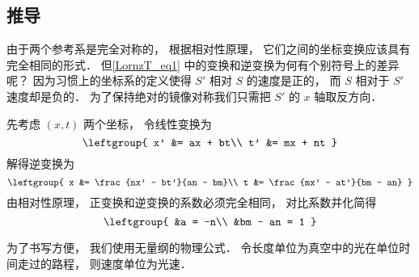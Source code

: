 \subsection{推导}
由于两个参考系是完全对称的， 根据相对性原理， 它们之间的坐标变换应该具有完全相同的形式． 但\autoref{LornzT_eq1} 中的变换和逆变换为何有个别符号上的差异呢？ 因为习惯上的坐标系的定义使得 $S'$ 相对 $S$ 的速度是正的， 而 $S$ 相对于 $S'$ 速度却是负的． 为了保持绝对的镜像对称我们只需把 $S'$ 的 $x$ 轴取反方向．

先考虑 $(x, t)$ 两个坐标， 令线性变换为
\begin{equation}
\leftgroup{
x' &= ax + bt\\
t' &= mx + nt
}
\end{equation}
解得逆变换为
\begin{equation}
\leftgroup{
x &= \frac{nx' - bt'}{an - bm}\\
t &= \frac{mx' - at'}{bm - an}
}
\end{equation}
由相对性原理， 正变换和逆变换的系数必须完全相同， 对比系数并化简得
\begin{equation}
\leftgroup{
&a = -n\\
&bm - an = 1
}
\end{equation}

为了书写方便， 我们使用无量纲的物理公式． 令长度单位为真空中的光在单位时间走过的路程， 则速度单位为光速．

